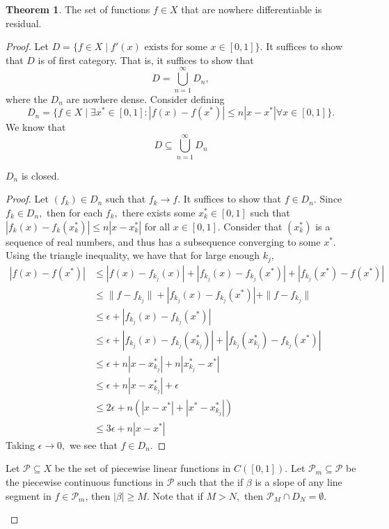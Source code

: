 \documentclass[10pt, oneside]{article}
\theoremstyle{definition}
\newtheorem{thm}{Theorem}
\begin{document}
\begin{thm}
    The set of functions $f \in X$ that are nowhere differentiable is residual.
\end{thm}
\begin{proof}
    Let $D= \{f \in X \mid f'(x) \text{ exists for some }x\in [0,1]\}.$ It suffices to show that $D$ is of first category. That is, it suffices to show that 
    \[D = \bigcup_{n=1}^\infty D_n,\] where the $D_n$ are nowhere dense. Consider defining 
    \[D_n = \{f\in X \mid \exists x^* \in [0,1] : |f(x) - f(x^*)| \leq n|x-x^*|\forall x\in [0,1] \}.\] We know that 
    \[D \subseteq \bigcup_{n=1}^\infty D_n\]
\begin{lemma}
    $D_n$ is closed.
\end{lemma}
\begin{proof}
    Let $(f_k) \in D_n$ such that $f_k \to f.$ It suffices to show that $f\in D_n.$ Since $f_k \in D_n,$ then for each $f_k,$ there exists some $x^*_k \in [0,1]$ such that $|f_k(x) - f_k(x^*_k)| \leq n|x - x^*_k|$ for all $x\in [0,1].$ Consider that $(x^*_k)$ is a sequence of real numbers, and thus has a subsequence converging to some $x^*$.
    Using the triangle inequality, we have that for large enough $k_j,$ 
    \begin{align*}
|f(x) - f(x^*)| &\leq |f(x) - f_{k_j}(x)| + |f_{k_j}(x) - f_{k_j}(x^*)| + |f_{k_j}(x^*) - f(x^*)|    \\
&\leq \|f - f_{k_j}\| + |f_{k_j}(x) - f_{k_j}(x^*)| + \|f- f_{k_j}\|\\
&\leq \epsilon + |f_{k_j}(x) - f_{k_j}(x^*)|\\
&\leq \epsilon + |f_{k_j}(x) - f_{k_j}(x^*_{k_j})| + |f_{k_j}(x_{k_j}^*) - f_{k_j}(x^*)|\\
&\leq \epsilon + n|x - x_{k_j}^*| + n|x_{k_j}^* - x^*|\\
&\leq \epsilon + n|x - x_{k_j}^*| + \epsilon\\
&\leq 2\epsilon + n(|x-x^*| + |x^* - x_{k_j}^*|)\\
&\leq 3\epsilon + n|x - x^*|
    \end{align*}
    Taking $\epsilon \to 0,$ we see that $f\in D_n.$ 
\end{proof}
Let $\mathcal{P}\subseteq X$ be the set of piecewise linear functions in $C([0,1]).$ Let $\mathcal{P}_m\subseteq \mathcal{P}$ be the piecewise continuous functions in $\mathcal{P}$ such that the if $\beta$ is a slope of any line segment in $f \in \mathcal{P}_m$, then $|\beta|\geq M.$ Note that if $M >N,$ then $\mathcal{P}_M \cap D_N = \emptyset.$ 
\begin{lemma}

\end{lemma}
\end{proof}
\end{document}
